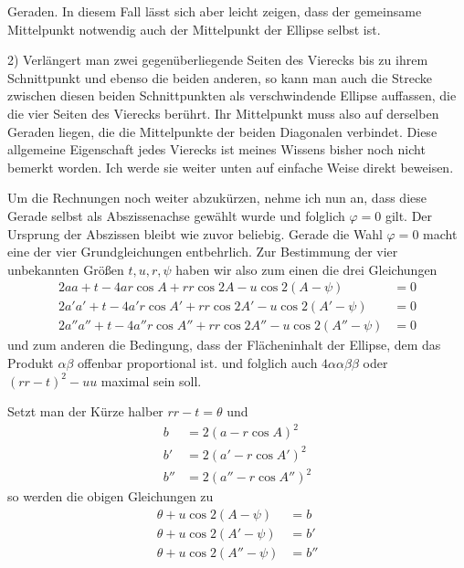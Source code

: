 %
Geraden. In diesem Fall lässt sich aber leicht zeigen, dass der gemeinsame Mittelpunkt notwendig auch der Mittelpunkt der Ellipse selbst ist.

2) Verlängert man zwei gegenüberliegende Seiten des Vierecks bis zu ihrem Schnittpunkt und ebenso die beiden anderen, so kann man auch die Strecke zwischen diesen beiden Schnittpunkten als verschwindende Ellipse auffassen, die die vier Seiten des Vierecks berührt. Ihr Mittelpunkt muss also auf derselben Geraden liegen, die die Mittelpunkte der beiden Diagonalen verbindet. Diese allgemeine Eigenschaft jedes Vierecks ist meines Wissens bisher noch nicht bemerkt worden. Ich werde sie weiter unten auf einfache Weise direkt beweisen.

Um die Rechnungen noch weiter abzukürzen, nehme ich nun an, dass diese Gerade selbst als Abszissenachse gewählt wurde und folglich \(\varphi=0\) gilt. Der Ursprung der Abszissen bleibt wie zuvor beliebig. Gerade die Wahl \(\varphi=0\) macht eine der vier Grundgleichungen entbehrlich. Zur Bestimmung der vier unbekannten Größen \(t,u,r,\psi\) haben wir also zum einen die drei Gleichungen
\[
\begin{aligned}
2aa+t-4ar\cos A+rr\cos2A-u\cos2(A-\psi)&=0\\
2a'a'+t-4a'r\cos A'+rr\cos2A'-u\cos2(A'-\psi)&=0\\
2a''a''+t-4a''r\cos A''+rr\cos2A''-u\cos2(A''-\psi)&=0
\end{aligned}
\]
und zum anderen die Bedingung, dass der Flächeninhalt der Ellipse, dem das Produkt \(\alpha\beta\) offenbar proportional ist. und folglich auch \(4\alpha\alpha\beta\beta\) oder \((rr-t)^2-uu\) maximal sein soll.

Setzt man der Kürze halber \(rr-t=\theta\) und
\[
\begin{aligned}
b&=2(a-r\cos A)^2\\
b'&=2(a'-r\cos A')^2\\
b''&=2(a''-r\cos A'')^2
\end{aligned}
\]
so werden die obigen Gleichungen zu
\[
\begin{aligned}
\theta+u\cos2(A-\psi)&=b\\
\theta+u\cos2(A'-\psi)&=b'\\
\theta+u\cos2(A''-\psi)&=b''
\end{aligned}
\]
